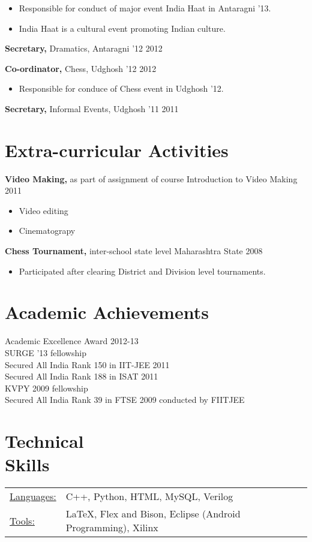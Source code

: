 \documentclass[margin]{res}
\begin{document}
\begin{resume}
\begin{itemize}
          
               \item Responsible for conduct of major event India Haat in Antaragni '13.
               \item India Haat is a cultural event promoting Indian culture.
          \end{itemize}
          
        {\bf Secretary,} Dramatics, Antaragni '12 \hfill 2012

		{\bf Co-ordinator,} Chess, Udghosh '12 \hfill   2012 
                \begin{itemize} \itemsep -2pt
                 \item  Responsible for conduce of Chess event in Udghosh '12.
                  \end{itemize}
        {\bf Secretary,} Informal Events, Udghosh '11 \hfill 2011
                
\section{Extra-curricular Activities}
		{\bf Video Making,} as part of assignment of course Introduction to Video Making \hfill 2011
		\begin{itemize} \itemsep -2pt
			\item Video editing
			\item Cinematograpy
		\end{itemize}
		
		{\bf Chess Tournament,} inter-school state level Maharashtra State \hfill 2008
		\begin{itemize}
			\item Participated after clearing District and Division level tournaments.
		\end{itemize}
		
\section{Academic Achievements} 
Academic Excellence Award 2012-13 \\
SURGE '13 fellowship \\
Secured All India Rank 150 in IIT-JEE 2011 \\
Secured All India Rank 188 in ISAT 2011 \\
KVPY 2009 fellowship \\
Secured All India Rank 39 in FTSE 2009 conducted by FIITJEE


\section{Technical \\ Skills}
   \begin{tabular}{l p{5in}}
    \underline{Languages:} & C++, Python, HTML, MySQL, Verilog \\

     \underline{Tools:} &  \LaTeX, Flex and Bison, Eclipse (Android Programming), Xilinx
 \end{tabular}

\end{resume} 
\end{document}
